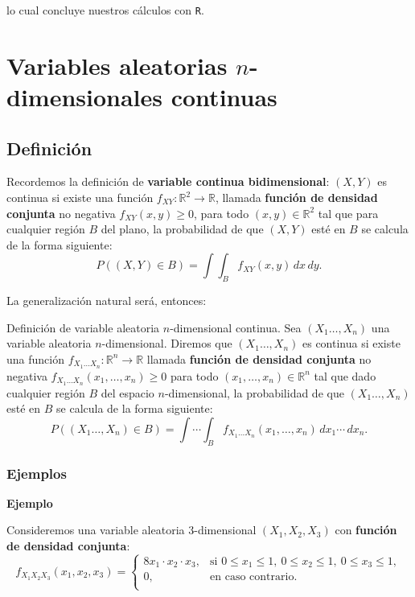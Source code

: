 \documentclass[]{book}
\begin{document}
lo cual concluye nuestros cálculos con \texttt{R}.

\hypertarget{variables-aleatorias-n-dimensionales-continuas}{%
\section{\texorpdfstring{Variables aleatorias \(n\)-dimensionales continuas}{Variables aleatorias n-dimensionales continuas}}\label{variables-aleatorias-n-dimensionales-continuas}}

\hypertarget{definiciuxf3n-5}{%
\subsection{Definición}\label{definiciuxf3n-5}}

Recordemos la definición de \textbf{variable continua bidimensional}: \((X,Y)\) es continua si existe una función \(f_{XY}:\mathbb{R}^2\longrightarrow \mathbb{R}\), llamada \textbf{función de densidad conjunta} no negativa \(f_{XY}(x,y)\geq 0\), para todo \((x,y)\in\mathbb{R}^2\) tal que para cualquier región \(B\) del plano, la probabilidad de que \((X,Y)\) esté en \(B\) se calcula de la forma siguiente:
\[
P((X,Y)\in B)=\int\int_B f_{XY}(x,y)\,dx\, dy.
\]

La generalización natural será, entonces:

Definición de variable aleatoria \(n\)-dimensional continua.
Sea \((X_1\ldots,X_n)\) una variable aleatoria \(n\)-dimensional. Diremos que \((X_1\ldots,X_n)\) es continua si existe una función
\(f_{X_1\ldots X_n}:\mathbb{R}^n\longrightarrow \mathbb{R}\) llamada \textbf{función de densidad conjunta} no negativa \(f_{X_1\ldots X_n}(x_1,\ldots,x_n)\geq 0\) para todo \((x_1,\ldots,x_n)\in\mathbb{R}^n\) tal que dado cualquier región \(B\) del espacio \(n\)-dimensional, la probabilidad de que \((X_1\ldots,X_n)\) esté en \(B\) se calcula de la forma siguiente:
\[
P((X_1\ldots,X_n)\in B)=\int\cdots\int_B f_{X_1\ldots X_n}(x_1,\ldots,x_n)\,dx_1\cdots\,dx_n.
\]

\hypertarget{ejemplos-12}{%
\subsubsection{Ejemplos}\label{ejemplos-12}}

\textbf{Ejemplo}

Consideremos una variable aleatoria \(3\)-dimensional \((X_1,X_2,X_3)\) con \textbf{función de densidad conjunta}:
\[
f_{X_1X_2X_3}(x_1,x_2,x_3)=\begin{cases}
8 x_1\cdot x_2\cdot x_3, & \mbox{si }0\leq x_1\leq 1,\ 0\leq x_2\leq 1,\ 0\leq x_3\leq 1, \\
0, & \mbox{en caso contrario.}\\
\end{cases}
\]
\end{document}

